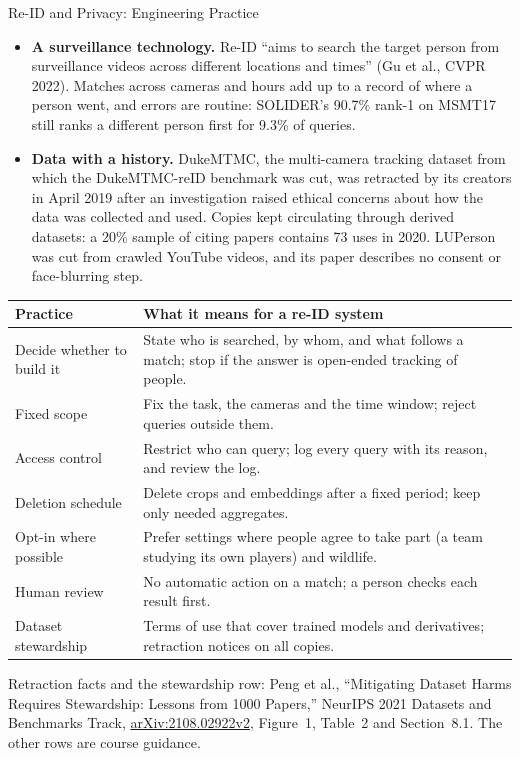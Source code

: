 \begin{frame}{Re-ID and Privacy: Engineering Practice}
  \begin{itemize}\scriptsize\itemsep0.25em
    \item \textbf{A surveillance technology.} Re-ID ``aims to search the target person from surveillance videos across different locations and times'' (Gu et al., CVPR 2022). Matches across cameras and hours add up to a record of where a person went, and errors are routine: SOLIDER's 90.7\% rank-1 on MSMT17 still ranks a different person first for 9.3\% of queries.
    \item \textbf{Data with a history.} DukeMTMC, the multi-camera tracking dataset from which the DukeMTMC-reID benchmark was cut, was retracted by its creators in April 2019 after an investigation raised ethical concerns about how the data was collected and used. Copies kept circulating through derived datasets: a 20\% sample of citing papers contains 73 uses in 2020. LUPerson was cut from crawled YouTube videos, and its paper describes no consent or face-blurring step.
  \end{itemize}
  \vspace{0.2em}
  {\centering\scriptsize
  \begin{tabular}{p{2.9cm} p{9.5cm}}
    \toprule
    \textbf{Practice} & \textbf{What it means for a re-ID system} \\
    \midrule
    Decide whether to build it & State who is searched, by whom, and what follows a match; stop if the answer is open-ended tracking of people. \\
    Fixed scope & Fix the task, the cameras and the time window; reject queries outside them. \\
    Access control & Restrict who can query; log every query with its reason, and review the log. \\
    Deletion schedule & Delete crops and embeddings after a fixed period; keep only needed aggregates. \\
    Opt-in where possible & Prefer settings where people agree to take part (a team studying its own players) and wildlife. \\
    Human review & No automatic action on a match; a person checks each result first. \\
    Dataset stewardship & Terms of use that cover trained models and derivatives; retraction notices on all copies. \\
    \bottomrule
  \end{tabular}\par}
  \vspace{0.1em}
  {\scriptsize Retraction facts and the stewardship row: Peng et al., ``Mitigating Dataset Harms Requires Stewardship: Lessons from 1000 Papers,'' NeurIPS 2021 Datasets and Benchmarks Track, \href{https://arxiv.org/abs/2108.02922v2}{arXiv:2108.02922v2}, Figure~1, Table~2 and Section~8.1. The other rows are course guidance.\par}
\end{frame}
